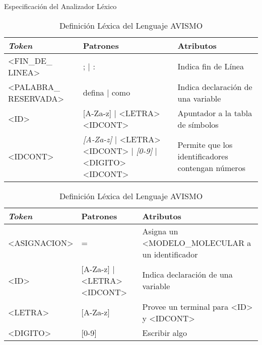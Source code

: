 \documentclass[14pt, aspectratio=169]{beamer}
\begin{document}
\begin{frame}{Especificación del Analizador Léxico}
     {
        \begin{table}[ht]
            \footnotesize
            \begin{tabularx}{\linewidth}{|X|X|X|}
                \hline
                \textit{Token}        & Patrones                                                                  & Atributos                                         \\\hline
                <FIN\_DE\_ LINEA>     & ; | :                                                                     & Indica fin de Línea                               \\\hline
                <PALABRA\_ RESERVADA> & defina | como                                                             & Indica declaración de una variable                \\\hline
                <ID>                  & [A-Za-z] | <LETRA> <IDCONT>                                               & Apuntador a la tabla de símbolos                  \\\hline
                <IDCONT>              & \textit{[A-Za-z]} | <LETRA> <IDCONT> | \textit{[0-9]} | <DIGITO> <IDCONT> & Permite que los identificadores contengan números \\\hline
            \end{tabularx}
            \label{table: lexTable1}
            \caption{Definición Léxica del Lenguaje AVISMO}
        \end{table}
    }
     {
        \begin{table}[ht]
            \footnotesize
            \begin{tabularx}{\linewidth}{|X|X|X|}
                \hline
                \textit{Token} & Patrones                    & Atributos                                       \\\hline
                <ASIGNACION>   & =                           & Asigna un <MODELO\_MOLECULAR a un identificador \\\hline
                <ID>           & [A-Za-z] | <LETRA> <IDCONT> & Indica declaración de una variable              \\\hline
                <LETRA>        & [A-Za-z]                    & Provee un terminal para <ID> y <IDCONT>         \\\hline
                <DIGITO>       & [0-9]                       & Escribir algo                                   \\\hline
            \end{tabularx}
            \label{table: lexTable2}
            \caption{Definición Léxica del Lenguaje AVISMO}
        \end{table}
    }
\end{frame}
\end{document}
